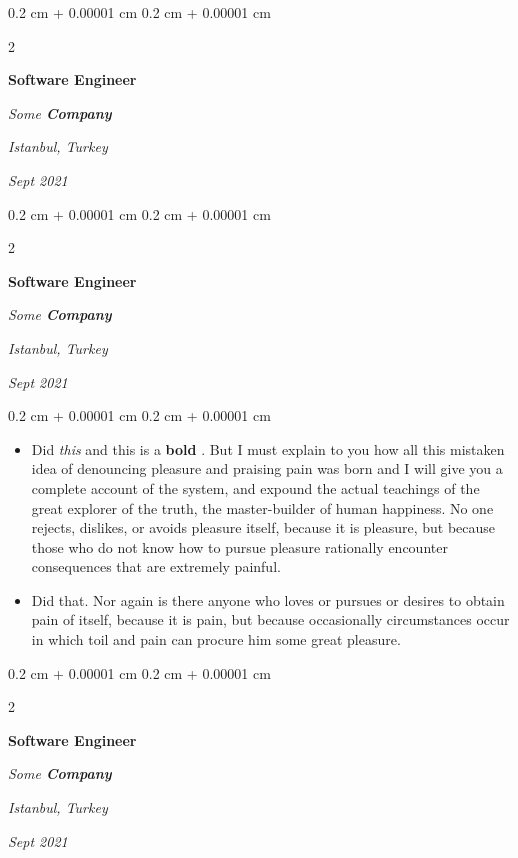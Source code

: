 \documentclass[10pt, letterpaper]{article}
\newenvironment{highlights}{
    \begin{itemize}[
        topsep=0.10 cm,
        parsep=0.10 cm,
        partopsep=0pt,
        itemsep=0pt,
        leftmargin=0.4 cm + 10pt
    ]
}{
    \end{itemize}
} %
\newenvironment{onecolentry}{
    \begin{adjustwidth}{
        0.2 cm + 0.00001 cm
    }{
        0.2 cm + 0.00001 cm
    }
}{
    \end{adjustwidth}
} %
\newenvironment{twocolentry}[2][]{
    \onecolentry
    \def\secondColumn{#2}
    \setcolumnwidth{\fill, 4.5 cm}
    \begin{paracol}{2}
}{
    \switchcolumn \raggedleft \secondColumn
    \end{paracol}
    \endonecolentry
} %
\let\hrefWithoutArrow\href
\renewcommand{\href}[2]{\hrefWithoutArrow{#1}{\ifthenelse{\equal{#2}{}}{ }{#2 }\raisebox{.15ex}{\footnotesize \faExternalLink*}}}
\begin{document}
        \vspace{0.2 cm}

        \begin{twocolentry}{
        \textit{Istanbul, Turkey}    
            
        \textit{Sept 2021}}
            \textbf{Software Engineer}
            
            \textit{Some \textbf{Company}}
        \end{twocolentry}



        \vspace{0.2 cm}

        \begin{twocolentry}{
        \textit{Istanbul, Turkey}    
            
        \textit{Sept 2021}}
            \textbf{Software Engineer}
            
            \textit{Some \textbf{Company}}
        \end{twocolentry}

        \vspace{0.10 cm}
        \begin{onecolentry}
            \begin{highlights}
                \item Did \textit{this} and this is a \textbf{bold} \href{https://example.com}{link}. But I must explain to you how all this mistaken idea of denouncing pleasure and praising pain was born and I will give you a complete account of the system, and expound the actual teachings of the great explorer of the truth, the master-builder of human happiness. No one rejects, dislikes, or avoids pleasure itself, because it is pleasure, but because those who do not know how to pursue pleasure rationally encounter consequences that are extremely painful.
                \item Did that. Nor again is there anyone who loves or pursues or desires to obtain pain of itself, because it is pain, but because occasionally circumstances occur in which toil and pain can procure him some great pleasure.
            \end{highlights}
        \end{onecolentry}


        \vspace{0.2 cm}

        \begin{twocolentry}{
        \textit{Istanbul, Turkey}    
            
        \textit{Sept 2021}}
            \textbf{Software Engineer}
            
            \textit{Some \textbf{Company}}
        \end{twocolentry}
\end{document}
